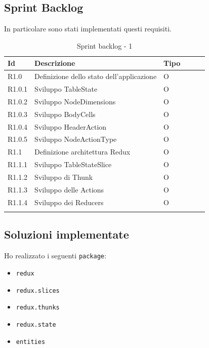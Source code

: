 \subsection{Sprint Backlog}
In particolare sono stati implementati questi requisiti.
\begin{longtable} {
		|>{}p{10mm}| 
		|>{}p{90mm}|
		|>{}p{15mm}|
		|>{}p{15mm}|
		|>{}p{15mm}|
		>{}p{0mm}}
	\hline
	\textbf{Id} & \textbf{Descrizione} & \textbf{Tipo} \\ \hline
	R1.0 & Definizione dello stato dell'applicazione & O \\ \hline
	R1.0.1 & Sviluppo TableState        & O\\ \hline
	R1.0.2 & Sviluppo NodeDimensions    & O\\ \hline
	R1.0.3 & Sviluppo BodyCells         & O\\ \hline
	R1.0.4 & Sviluppo HeaderAction      & O\\ \hline
	R1.0.5 & Sviluppo NodeActionType    & O\\ \hline
	R1.1   & Definizione architettura Redux & O\\ \hline
	R1.1.1 & Sviluppo TableStateSlice    & O\\ \hline
	R1.1.2 & Sviluppo di Thunk & O\\ \hline
	R1.1.3 & Sviluppo delle Actions & O\\ \hline
	R1.1.4 & Sviluppo dei Reducers & O\\ \hline
	\caption{Sprint backlog - 1}
\end{longtable}

\subsection{Soluzioni implementate}
Ho realizzato i seguenti \verb|package|:
\begin{itemize}
	\item \verb|redux|
	\item \verb|redux.slices|
	\item \verb|redux.thunks|
	\item \verb|redux.state|
	\item \verb|entities|
\end{itemize}

